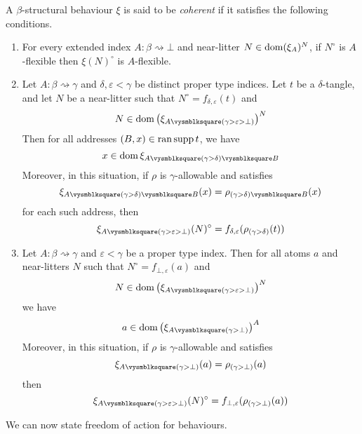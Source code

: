 \begin{definition}
    \label{def:foa:beh_coherent}
    A \( \beta \)-structural behaviour \( \xi \) is said to be \emph{coherent} if it satisfies the following conditions.
    \begin{enumerate}
        \item For every extended index \( A : \beta \rightsquigarrow \bot \) and near-litter \( N \in \operatorname{dom} (\xi_A)^N \), if \( N^\circ \) is \( A \)-flexible then \( \xi(N)^\circ \) is \( A \)-flexible.
        \item Let \( A : \beta \rightsquigarrow \gamma \) and \( \delta, \varepsilon < \gamma \) be distinct proper type indices.
        Let \( t \) be a \( \delta \)-tangle, and let \( N \) be a near-litter such that \( N^\circ = f_{\delta,\varepsilon}(t) \) and
        \[ N \in \dom \left(\xi_{A \pcomp (\gamma > \varepsilon > \bot)}\right)^N \]
        Then for all addresses \( (B, x) \in \operatorname{ran} \operatorname{supp} t \), we have
        \[ x \in \dom \xi_{A \pcomp (\gamma > \delta) \pcomp B} \]
        Moreover, in this situation, if \( \rho \) is \( \gamma \)-allowable and satisfies
        \[ \xi_{A \pcomp (\gamma > \delta) \pcomp B}(x) = \rho_{(\gamma > \delta) \pcomp B}(x) \]
        for each such address, then
        \[ \xi_{A \pcomp (\gamma > \varepsilon > \bot)}(N)^\circ = f_{\delta,\varepsilon}(\rho_{(\gamma > \delta)}(t)) \]
        \item Let \( A : \beta \rightsquigarrow \gamma \) and \( \varepsilon < \gamma \) be a proper type index.
        Then for all atoms \( a \) and near-litters \( N \) such that \( N^\circ = f_{\bot,\varepsilon}(a) \) and
        \[ N \in \dom \left(\xi_{A \pcomp (\gamma > \varepsilon > \bot)}\right)^N \]
        we have
        \[ a \in \dom \left(\xi_{A \pcomp (\gamma > \bot)}\right)^A \]
        Moreover, in this situation, if \( \rho \) is \( \gamma \)-allowable and satisfies
        \[ \xi_{A \pcomp (\gamma > \bot)}(a) = \rho_{(\gamma > \bot)}(a) \]
        then
        \[ \xi_{A \pcomp (\gamma > \varepsilon > \bot)}(N)^\circ = f_{\bot,\varepsilon}(\rho_{(\gamma > \bot)}(a)) \]
    \end{enumerate}
\end{definition}

We can now state freedom of action for behaviours.

